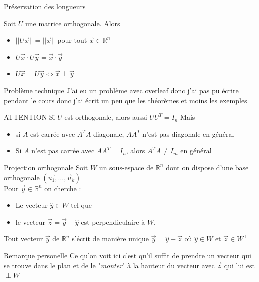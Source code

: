 \begin{parag}{Préservation des longueurs}
    \begin{theoreme}
        Soit $U$ une matrice orthogonale. Alors
        \begin{itemize}
            \item $||U\vec{x}|| = ||\vec{x}||$ pour tout $\vec{x} \in \mathbb{R}^n$
            \item $U\vec{x}\cdot U\vec{y} = \vec{x}\cdot \vec{y}$
            \item $U\vec{x} \perp U\vec{y} \Leftrightarrow \vec{x}\perp \vec{y}$
        \end{itemize}
    \end{theoreme}
    \begin{subparag}{Problème technique}
        J'ai eu un problème avec overleaf donc j'ai pas pu écrire pendant le cours donc j'ai écrit un peu que les théorèmes et moins les exemples
    \end{subparag}
\end{parag}

\begin{parag}{ATTENTION}
    Si $U$ est orthogonale, alors aussi $UU^T = I_n$ Mais
    \begin{itemize}
        \item si $A$ est carrée avec $A^TA$ diagonale, $AA^T$ n'est pas diagonale en général
        \item Si $A$ n'est pas carrée avec $AA^T = I_n$, alors $A^TA \neq I_m$ en général
    \end{itemize}
\end{parag}
\begin{parag}{Projection orthogonale}
    Soit $W$ un sous-espace de $\mathbb{R}^n$ dont on dispose d'une base orthogonale $(\vec{u_1}, \dots, \vec{u}_k)$\\
    Pour $\vec{y} \in \mathbb{R}^n$ on cherche :
    \begin{itemize}
        \item Le vecteur $\hat{y}\in W$ tel que
        \item le vecteur $\vec{z} = \vec{y}-\hat{y}$ est perpendiculaire à $W$.
    \end{itemize}
    \begin{theoreme}
        Tout vecteur $\vec{y}$ de $\mathbb{R}^n$ s'écrit de manière unique $\vec{y} = \hat{y}+\vec{z}$ où $\hat{y}\in W$ et $\vec{z}\in W^\perp$
    \end{theoreme}
    \begin{subparag}{Remarque personelle}
        Ce qu'on voit ici c'est qu'il suffit de prendre un vecteur qui se trouve dans le plan et de le "\textit{monter}" à la hauteur du vecteur avec $\vec{z}$ qui lui est $\perp W$
    \end{subparag}
\end{parag}

